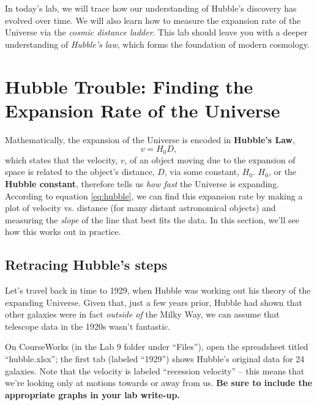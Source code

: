 \documentclass[11pt]{article}
\begin{document}
\medskip \noindent
In today's lab, we will trace how our understanding of Hubble's discovery has evolved over time. We will also learn how to measure the expansion rate of the Universe via the \emph{cosmic distance ladder}. This lab should leave you with a deeper understanding of \emph{Hubble's law}, which forms the foundation of modern cosmology.

\section{Hubble Trouble: Finding the Expansion Rate of the Universe}

Mathematically, the expansion of the Universe is encoded in \textbf{Hubble's Law},
\begin{equation} \label{eq:hubble}
    v = H_0 D,
\end{equation}
which states that the velocity, $v$, of an object moving due to the expansion of space is related to the object's distance, $D$, via some constant, $H_0$. $H_0$, or the \textbf{Hubble constant}, therefore tells us \emph{how fast} the Universe is expanding. According to equation \ref{eq:hubble}, we can find this expansion rate by making a plot of velocity vs. distance (for many distant astronomical objects) and measuring the \emph{slope} of the line that best fits the data. In this section, we'll see how this works out in practice.


\subsection{Retracing Hubble's steps}

Let's travel back in time to 1929, when Hubble was working out his theory of the expanding Universe. Given that, just a few years prior, Hubble had shown that other galaxies were in fact \emph{outside of} the Milky Way, we can assume that telescope data in the 1920s wasn't fantastic. 

\medskip \noindent
On CourseWorks (in the Lab 9 folder under ``Files''), open the spreadsheet titled ``hubble.xlsx''; the first tab (labeled ``1929'') shows Hubble's original data for 24 galaxies. Note that the velocity is labeled ``recession velocity'' -- this means that we're looking only at motions towards or away from us.  \textbf{Be sure to include the appropriate graphs in your lab write-up.}
\end{document}
